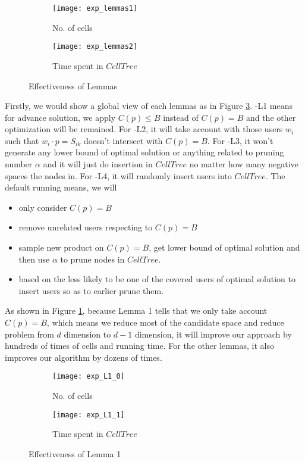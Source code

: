 \begin{figure}[ht!]
  \centering
  \begin{subfigure}[b]{0.45\linewidth}
    \texttt{[image: exp\_lemmas1]}
    \caption{No. of cells}
    \label{lemmas_on_cell}
  \end{subfigure}
  \begin{subfigure}[b]{0.45\linewidth}
    \texttt{[image: exp\_lemmas2]}
    \caption{Time spent in $CellTree$}
    \label{lemmas_on_time}
  \end{subfigure}
  \caption{Effectiveness of Lemmas}
  \label{lemmas}
\end{figure}

Firstly, we would show a global view of each lemmas as in Figure \ref{lemmas}.
-L1 means for advance solution, we apply $C(p)\leq B$ instead of $C(p)=B$ and 
the other optimization will be remained. For -L2, it will take account with those 
users $w_i$ such that $w_i\cdot p=S_{ik}$ doesn't intersect with $C(p)=B$. 
For -L3, it won't generate any lower bound of optimal solution or anything related
to pruning number $\alpha$ and it will just do insertion in $CellTree$ no matter how 
many negative spaces the nodes in. For -L4, it will randomly insert users into $CellTree$.
The default running means, we will
\begin{itemize}
  \item only consider $C(p)=B$
  \item remove unrelated users respecting to $C(p)=B$
  \item sample new product on $C(p)=B$, get lower bound of optimal solution and 
  then use $\alpha$ to prune nodes in $CellTree$.
  \item based on the less likely to be one of the covered users of optimal solution to insert 
  users so as to earlier prune them. 
\end{itemize}


As shown in Figure \ref{lemmas_on_cell}, because Lemma 1 tells that we only take account 
$C(p)=B$, which means we reduce most of the candidate space and reduce problem from 
$d$ dimension to $d-1$ dimension, it will improve our approach by hundreds of times of cells and running time. 
For the other lemmas, it also improves our algorithm by dozens of times.


\begin{figure}[ht!]
  \centering
  \begin{subfigure}[b]{0.45\linewidth}
    \texttt{[image: exp\_L1\_0]}
    \caption{No. of cells}
    \label{exp_L1_0}
  \end{subfigure}
  \begin{subfigure}[b]{0.45\linewidth}
    \texttt{[image: exp\_L1\_1]}
    \caption{Time spent in $CellTree$}
    \label{exp_L1_1}
  \end{subfigure}
  \caption{Effectiveness of Lemma 1}
  \label{exp_L1}
\end{figure}

